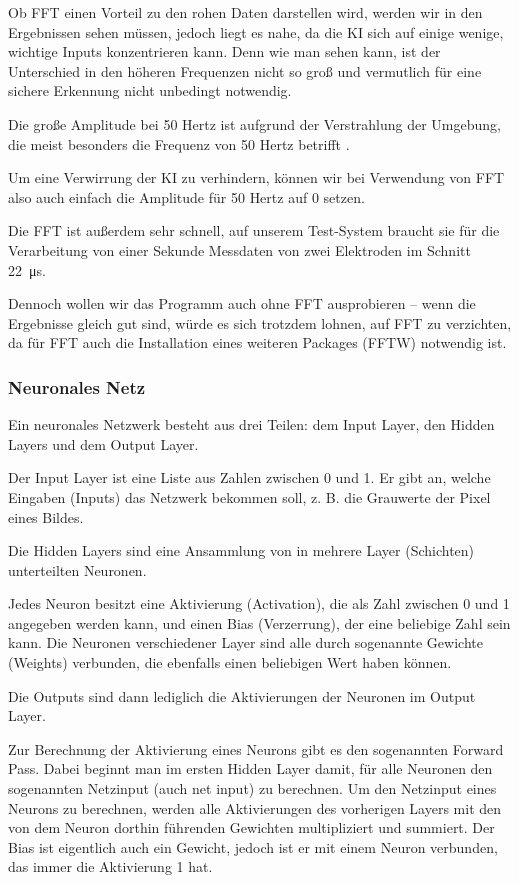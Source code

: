 \documentclass{scrartcl}
\begin{document}
	Ob FFT einen Vorteil zu den rohen Daten darstellen wird, werden wir in den Ergebnissen sehen müssen, jedoch liegt es nahe, da die KI sich auf einige wenige, wichtige Inputs konzentrieren kann. Denn wie man sehen kann, ist der Unterschied in den höheren Frequenzen nicht so groß und vermutlich für eine sichere Erkennung nicht unbedingt notwendig.

	Die große Amplitude bei 50 Hertz ist aufgrund der Verstrahlung der Umgebung, die meist besonders die Frequenz von 50 Hertz betrifft \cite{Praktikum}. %

	Um eine Verwirrung der KI zu verhindern, können wir bei Verwendung von FFT also auch einfach die Amplitude für 50 Hertz auf 0 setzen.

	Die FFT ist außerdem sehr schnell, auf unserem Test-System braucht sie für die Verarbeitung von einer Sekunde Messdaten von zwei Elektroden im Schnitt \qty{22}{\micro\second}.

	Dennoch wollen wir das Programm auch ohne FFT ausprobieren -- wenn die Ergebnisse gleich gut sind, würde es sich trotzdem lohnen, auf FFT zu verzichten, da für FFT auch die Installation eines weiteren Packages (FFTW) notwendig ist. 

	\subsubsection{Neuronales Netz}

	Ein neuronales Netzwerk besteht aus drei Teilen: dem Input Layer, den Hidden Layers und dem Output Layer.

	Der Input Layer ist eine Liste aus Zahlen zwischen 0 und 1. Er gibt an, welche Eingaben (Inputs) das Netzwerk bekommen soll, z. B. die Grauwerte der Pixel eines Bildes.
	
	Die Hidden Layers sind eine Ansammlung von in mehrere Layer (Schichten) unterteilten Neuronen.
	
	Jedes Neuron besitzt eine Aktivierung (Activation), die als Zahl zwischen 0 und 1 angegeben werden kann, und einen Bias (Verzerrung), der eine beliebige Zahl sein kann. Die Neuronen verschiedener Layer sind alle durch sogenannte Gewichte (Weights) verbunden, die ebenfalls einen beliebigen Wert haben können.

	Die Outputs sind dann lediglich die Aktivierungen der Neuronen im Output Layer.


	Zur Berechnung der Aktivierung eines Neurons gibt es den sogenannten Forward Pass. Dabei beginnt man im ersten Hidden Layer damit, für alle Neuronen den sogenannten Netzinput (auch net input) zu berechnen. Um den Netzinput eines Neurons zu berechnen, werden alle Aktivierungen des vorherigen Layers mit den von dem Neuron dorthin führenden Gewichten multipliziert und summiert. Der Bias ist eigentlich auch ein Gewicht, jedoch ist er mit einem Neuron verbunden, das immer die Aktivierung 1 hat.
\end{document}

